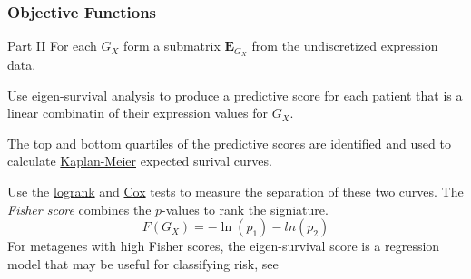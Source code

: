 \documentclass[
	11pt, %
]{beamer}
\begin{document}
\begin{frame}
    \frametitle{Objective Functions}
    \begin{block}{Part II}
        For each $G_X$ form a submatrix $\mathbf{E}_{G_X}$ from the undiscretized expression data.
        \smallskip
        \pause

        Use eigen-survival analysis to produce a predictive score for each patient that is a linear combinatin of their expression values for $G_X$.
        \smallskip
        \pause

        The top and bottom quartiles of the predictive scores are identified and used to calculate \href{https://www.mygreatlearning.com/blog/kaplan-meier-curve-explained}{Kaplan-Meier} expected surival curves.
        \smallskip
        \pause

        Use the \href{https://en.wikipedia.org/wiki/Logrank_test}{logrank} and \href{https://encyclopediaofmath.org/wiki/Cox_regression_model}{Cox} tests to measure the separation of these two curves. The \emph{Fisher score} combines the $p$-values to rank the signiature.
        \begin{equation*}
            F(G_X) = -\ln(p_1)-ln(p_2)
        \end{equation*}
        \pause
        For metagenes with high Fisher scores, the eigen-survival score is a regression model that may be useful for classifying risk, see \cite{p3}
    \end{block}
\end{frame}

\end{document}
